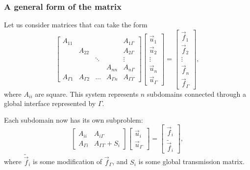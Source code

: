 \documentclass[10pt]{beamer}
\begin{document}
\begin{frame}
\frametitle{A general form of the matrix}

Let us consider matrices that can take the form
\begin{equation} \label{eq: lin sys}
	\begin{bmatrix}
		A_{11} & & & & A_{1 \Gamma} \\
		& A_{22} & & & A_{2 \Gamma} \\
		& & \ddots & & \vdots \\
		& & & A_{nn} & A_{n \Gamma} \\
		A_{\Gamma 1} & A_{\Gamma 2} & \dots & A_{\Gamma n} & A_{\Gamma \Gamma}
	\end{bmatrix}
	\begin{bmatrix} \vec{u}_1 \\ \vec{u}_2 \\ \vdots \\ \vec{u}_n \\ \vec{u}_\Gamma \end{bmatrix}
	=
	\begin{bmatrix} \vec{f}_1 \\ \vec{f}_2 \\ \vdots \\ \vec{f}_n \\ \vec{f}_\Gamma \end{bmatrix},
\end{equation}
where $A_{ii}$ are square.
This system represents $n$ subdomains connected through a global interface represented by $\Gamma$.

Each subdomain now has its own subproblem:
\begin{equation} \label{eq: subproblem}
	\begin{bmatrix}
		A_{ii} & A_{i \Gamma} \\
		A_{\Gamma i} & A_{\Gamma \Gamma} + S_i
	\end{bmatrix}
	\begin{bmatrix} \vec{u}_i \\ \vec{u}_\Gamma \end{bmatrix}
	=
	\begin{bmatrix} \vec{f}_i \\ \tilde{\vec{f}}_i \end{bmatrix},
\end{equation}
where $\tilde{\vec{f}}_i$ is some modification of $\vec{f}_\Gamma$,
and $S_i$ is some global transmission matrix.
\end{frame}
\end{document}

